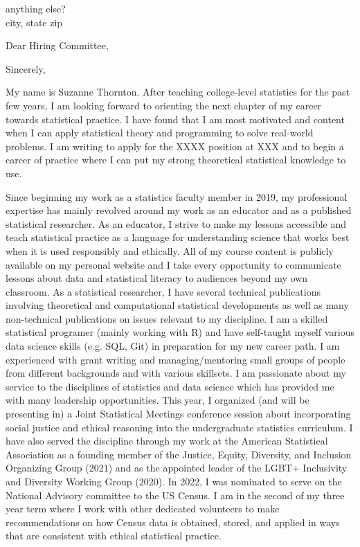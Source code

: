 \documentclass[11pt,a4paper,sans]{moderncv}
\begin{document}
	
	{anything else?\\ 
	city, state zip}
	\date{\today }
	\opening{Dear Hiring Committee,}
	\closing{Sincerely,}
	\makelettertitle
	
	
	
	
	
	My name is Suzanne Thornton. After teaching college-level statistics for the past few years, I am looking forward to orienting the next chapter of my career towards statistical practice. I have found that I am most motivated and content when I can apply statistical theory and programming to solve real-world problems. I am writing to apply for the XXXX position at XXX and to begin a career of practice where I can put my strong theoretical statistical knowledge to use.\\ \vspace{.5cm}

Since beginning my work as a statistics faculty member in 2019, my professional expertise has mainly revolved around my work as an educator and as a published statistical researcher. As an educator, I strive to make my lessons accessible and teach statistical practice as a language for understanding science that works best when it is used responsibly and ethically. All of my course content is publicly available on my personal website and I take every opportunity to communicate lessons about data and statistical literacy to audiences beyond my own classroom. As a statistical researcher, I have several technical publications involving theoretical and computational statistical developments as well as many non-technical publications on issues relevant to my discipline. I am a skilled statistical programer (mainly working with R) and have self-taught myself various data science skills (e.g. SQL, Git) in preparation for my new career path. I am experienced with grant writing and managing/mentoring small groups of people from different backgrounds and with various skillsets. %
I am passionate about my service to the disciplines of statistics and data science which has provided me with many leadership opportunities. This year, I organized (and will be presenting in) a Joint Statistical Meetings conference session about incorporating social justice and ethical reasoning into the undergraduate statistics curriculum. I have also served the discipline through my work at the American Statistical Association as a founding member of the Justice, Equity, Diversity, and Inclusion Organizing Group (2021) and as the appointed leader of the LGBT+ Inclusivity and Diversity Working Group (2020). In 2022, I was nominated to serve on the National Advisory committee to the US Census. I am in the second of my three year term where I work with other dedicated volunteers to make recommendations on how Census data is obtained, stored, and applied in ways that are consistent with ethical statistical practice.   
	
\end{document}
